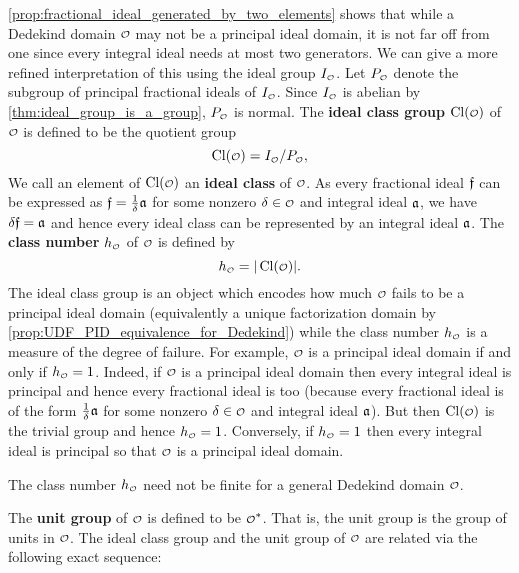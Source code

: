     \cref{prop:fractional_ideal_generated_by_two_elements} shows that while a Dedekind domain $\smc{O}$ may not be a principal ideal domain, it is not far off from one since every integral ideal needs at most two generators. We can give a more refined interpretation of this using the ideal group $I_{\smc{O}}$. Let $P_{\smc{O}}$ denote the subgroup of principal fractional ideals of $I_{\smc{O}}$. Since $I_{\smc{O}}$ is abelian by \cref{thm:ideal_group_is_a_group}, $P_{\smc{O}}$ is normal. The \textbf{ideal class group} $\Cl(\smc{O})$ of $\smc{O}$ is defined to be the quotient group
    \[
      \Cl(\smc{O}) = I_{\smc{O}}/P_{\smc{O}},
    \]
    We call an element of $\Cl(\smc{O})$ an \textbf{ideal class} of $\smc{O}$. As every fractional ideal $\mathfrak{f}$ can be expressed as $\mathfrak{f} = \frac{1}{\delta}\mathfrak{a}$ for some nonzero $\d \in \smc{O}$ and integral ideal $\mathfrak{a}$, we have $\delta\mathfrak{f} = \mathfrak{a}$ and hence every ideal class can be represented by an integral ideal $\mathfrak{a}$. The \textbf{class number} $h_{\smc{O}}$ of $\smc{O}$ is defined by
    \[
      h_{\smc{O}} = |\Cl(\smc{O})|.
    \]
    The ideal class group is an object which encodes how much $\smc{O}$ fails to be a principal ideal domain (equivalently a unique factorization domain by \cref{prop:UDF_PID_equivalence_for_Dedekind}) while the class number $h_{\smc{O}}$ is a measure of the degree of failure. For example, $\smc{O}$ is a principal ideal domain if and only if $h_{\smc{O}} = 1$. Indeed, if $\smc{O}$ is a principal ideal domain then every integral ideal is principal and hence every fractional ideal is too (because every fractional ideal is of the form $\frac{1}{\delta}\mathfrak{a}$ for some nonzero $\d \in \smc{O}$ and integral ideal $\mathfrak{a}$). But then $\Cl(\smc{O})$ is the trivial group and hence $h_{\smc{O}} = 1$. Conversely, if $h_{\smc{O}} = 1$ then every integral ideal is principal so that $\smc{O}$ is a principal ideal domain.

    \begin{remark}\label{rem:general_class_number_not_finite}
      The class number $h_{\smc{O}}$ need not be finite for a general Dedekind domain $\smc{O}$.
    \end{remark}
    
    The \textbf{unit group} of $\smc{O}$ is defined to be $\smc{O}^{\ast}$. That is, the unit group is the group of units in $\smc{O}$. The ideal class group and the unit group of $\smc{O}$ are related via the following exact sequence:

